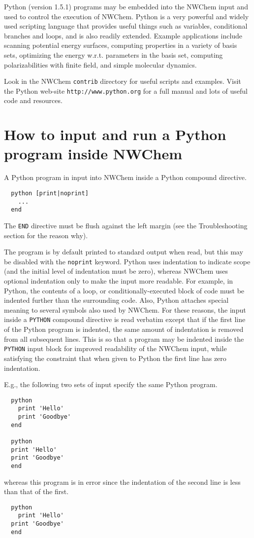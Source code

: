 \label{sec:python}

Python (version 1.5.1) programs may be embedded into the NWChem input
and used to control the execution of NWChem.  Python is a very
powerful and widely used scripting language that provides useful
things such as variables, conditional branches and loops, and is also
readily extended.  Example applications include scanning potential
energy surfaces, computing properties in a variety of basis sets,
optimizing the energy w.r.t. parameters in the basis set, computing
polarizabilities with finite field, and simple molecular dynamics.

Look in the NWChem \verb+contrib+ directory for useful scripts and
examples.  Visit the Python web-site \verb+http://www.python.org+ for
a full manual and lots of useful code and resources.

\section{How to input and run a Python program inside NWChem}

A Python program in input into NWChem inside a Python compound directive.
\begin{verbatim}
  python [print|noprint]
    ...
  end
\end{verbatim}
The \verb+END+ directive must be flush against the left
margin (see the Troubleshooting section for the reason why).

The program is by default printed to standard output when read, but
this may be disabled with the \verb+noprint+ keyword.  Python uses
indentation to indicate scope (and the initial level of indentation
must be zero), whereas NWChem uses optional indentation only to make
the input more readable.  For example, in Python, the contents of a
loop, or conditionally-executed block of code must be indented further
than the surrounding code.  Also, Python attaches special meaning to
several symbols also used by NWChem.  For these reasons, the input
inside a \verb+PYTHON+ compound directive is read verbatim except that
if the first line of the Python program is indented, the same amount
of indentation is removed from all subsequent lines.  This is so that
a program may be indented inside the \verb+PYTHON+ input block for
improved readability of the NWChem input, while satisfying the
constraint that when given to Python the first line has zero
indentation.

E.g., the following two sets of input specify the same Python program.
\begin{verbatim}
  python
    print 'Hello'
    print 'Goodbye'
  end

  python
  print 'Hello'
  print 'Goodbye'
  end
\end{verbatim}
whereas this program is in error since the indentation of the second
line is less than that of the first.
\begin{verbatim}
  python
    print 'Hello'
  print 'Goodbye'
  end
\end{verbatim}


